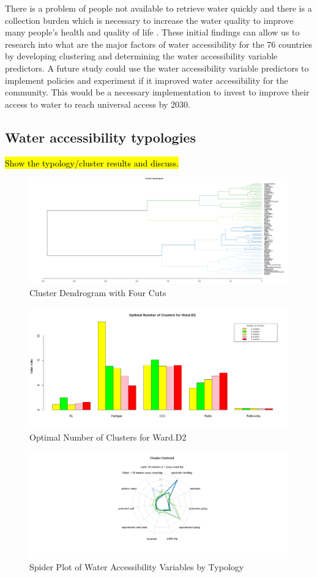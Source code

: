 \documentclass[10pt,twoside]{article}
\numberwithin{equation}{section}
\newcommand{\?}{\stackrel{?}{=}}
\begin{document}
There is a problem of people not available to retrieve water quickly and there is a collection burden which is necessary to increase the water quality to improve many people's health and quality of life \citep{cassivi2018access}. These initial findings can allow us to research into what are the major factors of water accessibility for the 76 countries by developing clustering and determining the water accessibility variable predictors. A future study could use the water accessibility variable predictors to implement policies and experiment if it improved water accessibility for the community. This would be a necessary implementation to invest to improve their access to water to reach universal access by 2030.



\subsection*{Water accessibility typologies}
\hl{Show the typology/cluster results and discuss.}



\begin{figure}[h!]
  \centering
  \includegraphics[width=.7\textwidth]{dendrogram}
  \caption{Cluster Dendrogram with Four Cuts}
  \label{fig:dendrogram}
\end{figure}
\begin{figure}[h!]
  \centering
  \includegraphics[width=.7\textwidth]{optimal-cuts}
  \caption{Optimal Number of Clusters for Ward.D2}
  \label{fig:optimal}
\end{figure}
\begin{figure}[h!]
  \centering
  \includegraphics[width=.7\textwidth]{spider-plot}
  \caption{Spider Plot of Water Accessibility Variables by Typology}
  \label{fig:spider}
\end{figure}
\end{document}
